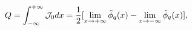 \begin{equation}
\label{carga}
Q=\int_{-\infty}^{+\infty}{\cal J}_{0}dx=\frac 12 [\lim_{x\rightarrow +\infty}
\tilde\phi_q(x)-
 \lim_{x\rightarrow -\infty}\tilde\phi_q(x)],
\end{equation}

